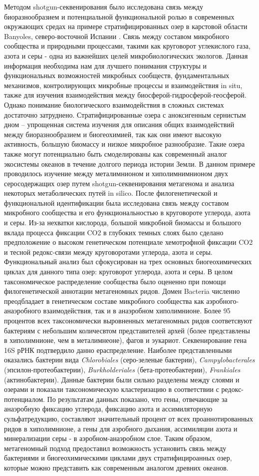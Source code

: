 Методом shotgun-секвенирования было исследована связь между биоразнообразием и потенциальной функциональной ролью в современных окружающих средах на примере стратифицированных озер  в карстовой области Banyoles, северо-восточной Испании \cite{MLO2015}. Связь между составом микробного сообщества и природными процессами, такими как круговорот углекислого газа, азота и серы  - одна из важнейших целей микробиологических экологов. Данная информация необходима нам для лучшего понимания структуры и функциональных возможностей микробных сообществ, фундаментальных механизмов, контролирующих микробные процессы и взаимодействия in situ, также для изучения взаимодействия между биосферой-гидросферой-геосферой. Однако понимание биологического взаимодействия в сложных системах достаточно затруднено.  Стратифицированные озера с аноксигенным сернистым дном – упрощенная система изучения для описания общих взаимодействий между биоразнообразием и биогеохимией, так как они имеют высокую активность, большую биомассу и низкое микробное разнообразие. Такие озера также могут потенциально быть смоделированы как современный аналог экосистемы океанов в течение долгого периода истории Земли. В данном примере проводилось изучение между металимнионом и хиполимнимнионом двух серосодержащих озер путем  shotgun-секвенирования метагенома и анализа некоторых метаболических путей in silico. После филогенетической и функциональной идентификации была исследована связь между составом микробного сообщества и его функциональностью в круговороте углерода, азота и серы. Из-за нехватки кислорода, большой микробной биомассы и большого вклада процесса фиксации CO2 в глубоких темных слоях было сделано предположение о высоком генетическом потенциале хемотрофной фиксации CO2 и тесной редокс-связи между круговоротами углерода, азота и серы. Функциональный анализ был сфокусирован на трех основных биогеохимических циклах для данного типа озер: круговорот углерода, азота и серы. В целом таксономическое распределение сообщества было оцененно при помощи филогенетической аннотации метагеномных ридов. Домен Bacteria численно преодбладает в генетическом составе микробного сообщества как аэробного-анаэробного взаимодействия, так и в анаэробном хиполимнионе. Более 95  процентов  всех таксономически выровненных метагеномных ридов соответсвуют бактериям с небольшим количесвтом представителей архей (более представлены в хиполимнионе, чем в металимнеоне), фагов и эукариот.  Секвенирование гена 16S рРНК подтвердило данно ераспределение. Наиболее представленными оказались бактерии вида \textit{Chlorobiales} (серо-зеленые бактерии), \textit{Campylobacterales} (эпсилон-протеобактерии), \textit{Burkholderiales} (бета-протеобактерии), \textit{Frankiales} (актинобактерии). Данные бактерии были сильно разделены между слоями и озерами и показали таксономическую кластеризацию в соответствии с редокс-потенциалом. По результатам данных показано, что гены, отвечающие за анаэробную фиксацию углерода, фиксацию азота и ассимиляторную сульфатредукцию, составляют значительный процент от всех проаннотированных ридов в хиполимнионе,  а гены для аэробного дыхания, ассимиляции азота и минерализации серы - в аэробном-анаэробном слое.  Таким образом, метагеномный подход предоставил возможность установить связь между бактериями и биогеохимическими циклами двух стратифицироанных озер, которые можно представить как современным аналогом древних океанов. 